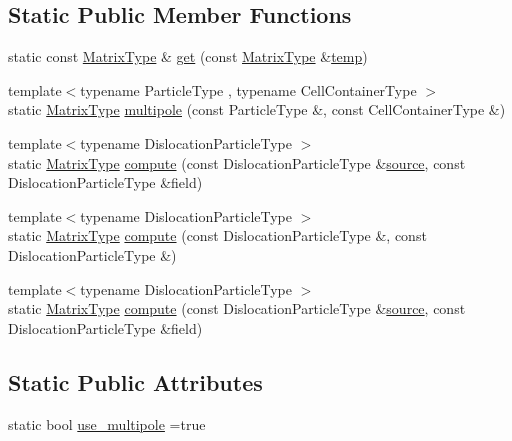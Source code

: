\subsection*{Static Public Member Functions}
\begin{DoxyCompactItemize}
\item 
static const \hyperlink{classmodel_1_1_dislocation_energy_a3cb7da857732ef0ffe2ed45d06737097}{Matrix\+Type} \& \hyperlink{classmodel_1_1_dislocation_energy_a1700e54fc53aaf89489e1d1c19738a20}{get} (const \hyperlink{classmodel_1_1_dislocation_energy_a3cb7da857732ef0ffe2ed45d06737097}{Matrix\+Type} \&\hyperlink{tube_plotter_8m_a905c521e05ec8042631a912b71d0454e}{temp})
\item 
{\footnotesize template$<$typename Particle\+Type , typename Cell\+Container\+Type $>$ }\\static \hyperlink{classmodel_1_1_dislocation_energy_a3cb7da857732ef0ffe2ed45d06737097}{Matrix\+Type} \hyperlink{classmodel_1_1_dislocation_energy_a91479d9718ff68dd9479cbc5ff1d6680}{multipole} (const Particle\+Type \&, const Cell\+Container\+Type \&)
\item 
{\footnotesize template$<$typename Dislocation\+Particle\+Type $>$ }\\static \hyperlink{classmodel_1_1_dislocation_energy_a3cb7da857732ef0ffe2ed45d06737097}{Matrix\+Type} \hyperlink{classmodel_1_1_dislocation_energy_ad1ff2b0500d5342a7b4251cf9b6fbf1d}{compute} (const Dislocation\+Particle\+Type \&\hyperlink{plot_network_8m_a6f3223812eea666f1fee426db5c8c563}{source}, const Dislocation\+Particle\+Type \&field)
\item 
{\footnotesize template$<$typename Dislocation\+Particle\+Type $>$ }\\static \hyperlink{classmodel_1_1_dislocation_energy_a3cb7da857732ef0ffe2ed45d06737097}{Matrix\+Type} \hyperlink{classmodel_1_1_dislocation_energy_a91e24624b4507cbb31f94f30ed8dac35}{compute} (const Dislocation\+Particle\+Type \&, const Dislocation\+Particle\+Type \&)
\item 
{\footnotesize template$<$typename Dislocation\+Particle\+Type $>$ }\\static \hyperlink{classmodel_1_1_dislocation_energy_a3cb7da857732ef0ffe2ed45d06737097}{Matrix\+Type} \hyperlink{classmodel_1_1_dislocation_energy_ad1ff2b0500d5342a7b4251cf9b6fbf1d}{compute} (const Dislocation\+Particle\+Type \&\hyperlink{plot_network_8m_a6f3223812eea666f1fee426db5c8c563}{source}, const Dislocation\+Particle\+Type \&field)
\end{DoxyCompactItemize}
\subsection*{Static Public Attributes}
\begin{DoxyCompactItemize}
\item 
static bool \hyperlink{classmodel_1_1_dislocation_energy_a69e79b7fbb8a90bae1676a05eddb5d1f}{use\+\_\+multipole} =true
\end{DoxyCompactItemize}


